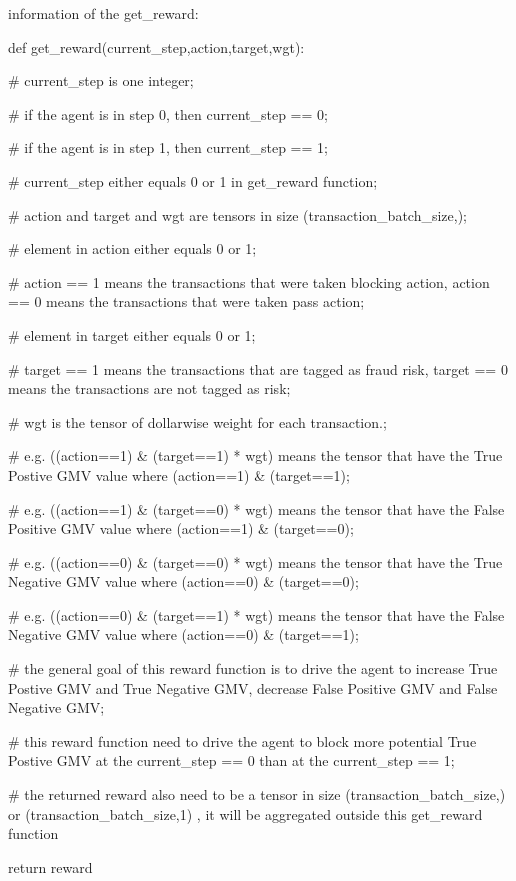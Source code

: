 \documentclass[11pt]{article}
\begin{document}
\begin{tcolorbox}[title=Prompt 3: Additional Reward Generation Instruction Prompts with Domain-Specific Context, colframe=blue, colback=white, breakable]

information of the get\_reward:

def get\_reward(current\_step,action,target,wgt):

    \# current\_step is one integer;
    
    \# if the agent is in step 0, then current\_step == 0;
    
    \# if the agent is in step 1, then current\_step == 1;
    
    \# current\_step either equals 0 or 1 in get\_reward function;
    
    \# action and target and wgt are tensors in size (transaction\_batch\_size,);
    
    \# element in action either equals 0 or 1;
    
    \# action == 1 means the transactions that were taken blocking action, action == 0 means the transactions that were taken pass action;
    
    \# element in target either equals 0 or 1;
    
    \# target == 1 means the transactions that are tagged as fraud risk, target == 0 means the transactions are not tagged as risk;
    
    \# wgt is the tensor of dollarwise weight for each transaction.;
    
    \# e.g. ((action==1) \& (target==1) * wgt) means the tensor that have the True Postive GMV value where (action==1) \& (target==1);
    
    \# e.g. ((action==1) \& (target==0) * wgt) means the tensor that have the False Positive GMV value where (action==1) \& (target==0);
    
    \# e.g. ((action==0) \& (target==0) * wgt) means the tensor that have the True Negative GMV value where (action==0) \& (target==0);
    
    \# e.g. ((action==0) \& (target==1) * wgt) means the tensor that have the False Negative GMV value where (action==0) \& (target==1);
    
   
    \# the general goal of this reward function is to drive the agent to increase True Postive GMV and True Negative GMV, decrease False Positive GMV and False Negative GMV;
    
    \# this reward function need to drive the agent to block more potential True Postive GMV at the current\_step == 0 than at the current\_step == 1;
    
    \# the returned reward also need to be a tensor in size (transaction\_batch\_size,) or (transaction\_batch\_size,1) , it will be aggregated outside this get\_reward function
    
   return reward
    
\end{tcolorbox}
\end{document}
